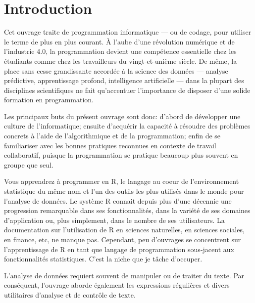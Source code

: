 
\chapter{Introduction}

Cet ouvrage traite de programmation informatique --- ou de codage,
pour utiliser le terme de plus en plus courant. À l'aube d'une
révolution numérique et de l'industrie 4.0, la programmation devient
une compétence essentielle chez les étudiants comme chez les
travailleurs du vingt-et-unième siècle. De même, la place sans cesse
grandissante accordée à la science des données --- analyse prédictive,
apprentissage profond, intelligence artificielle --- dans la plupart
des disciplines scientifiques ne fait qu'accentuer l'importance de
disposer d'une solide formation en programmation.

Les principaux buts du présent ouvrage sont donc: d'abord de
développer une culture de l'informatique; ensuite d'acquérir la
capacité à résoudre des problèmes concrets à l'aide de l'algorithmique
et de la programmation; enfin de se familiariser avec les bonnes
pratiques reconnues en contexte de travail collaboratif, puisque la
programmation se pratique beaucoup plus souvent en groupe que seul.

Vous apprendrez à programmer en R, le langage au coeur de
l'environnement statistique du même nom et l'un des outils les plus
utilisés dans le monde pour l'analyse de données. Le système R connait
depuis plus d'une décennie une progression remarquable dans ses
fonctionnalités, dans la variété de ses domaines d'application ou,
plus simplement, dans le nombre de ses utilisateurs. La documentation
sur l'utilisation de R en sciences naturelles, en sciences sociales,
en finance, etc, ne manque pas. Cependant, peu d'ouvrages se
concentrent sur l'apprentissage de R en tant que langage de
programmation sous-jacent aux fonctionnalités statistiques. C'est la
niche que je tâche d'occuper.

L'analyse de données requiert souvent de manipuler ou de traiter du
texte. Par conséquent, l'ouvrage aborde également les expressions
régulières et divers utilitaires d'analyse et de contrôle de texte.

